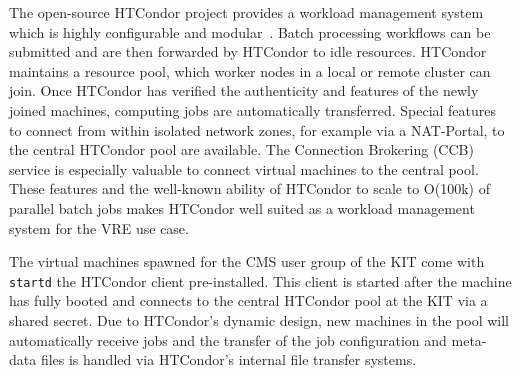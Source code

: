 The open-source HTCondor project provides a workload management system which is highly configurable and modular~\cite{HTCondor}. Batch processing workflows can be submitted and are then forwarded by HTCondor to idle resources. HTCondor maintains a resource pool, which worker nodes in a local or remote cluster can join. Once HTCondor has verified the authenticity and features of the newly joined machines, computing jobs are automatically transferred. Special features to connect from within isolated network zones, for example via a NAT-Portal, to the central HTCondor pool are available. The Connection Brokering (CCB) service is especially valuable to connect virtual machines to the central pool. These features and the well-known ability of HTCondor to scale to O(100k) of parallel batch jobs makes HTCondor well suited as a workload management system for the VRE use case.

The virtual machines spawned for the CMS user group of the KIT come with \texttt{startd} the HTCondor client pre-installed. This client is started after the machine has fully booted and connects to the central HTCondor pool at the KIT via a shared secret. Due to HTCondor's dynamic design, new machines in the pool will automatically receive jobs and the transfer of the job configuration and meta-data files is handled via HTCondor's internal file transfer systems.
